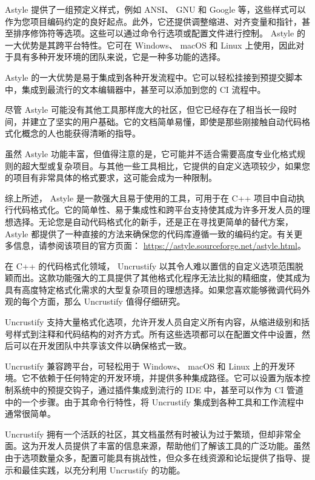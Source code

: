 Astyle 提供了一组预定义样式，例如 ANSI、 GNU 和 Google 等，这些样式可以作为您项目编码约定的良好起点。此外，它还提供调整缩进、对齐变量和指针，甚至排序修饰符等选项。这些可以通过命令行选项或配置文件进行控制。
Astyle 的一大优势是其跨平台特性。它可在 Windows、 macOS 和 Linux 上使用，因此对于具有多种开发环境的团队来说，它是一种多功能的选择。

Astyle 的一大优势是易于集成到各种开发流程中。它可以轻松挂接到预提交脚本中，集成到最流行的文本编辑器中，甚至可以添加到您的 CI 流程中。

尽管 Astyle 可能没有其他工具那样庞大的社区，但它已经存在了相当长一段时间，并建立了坚实的用户基础。它的文档简单易懂，即使是那些刚接触自动代码格式化概念的人也能获得清晰的指导。

虽然 Astyle 功能丰富，但值得注意的是，它可能并不适合需要高度专业化格式规则的超大型或复杂项目。与其他一些工具相比，它提供的自定义选项较少，如果您的项目有非常具体的格式要求，这可能会成为一种限制。

综上所述， Astyle 是一款强大且易于使用的工具，可用于在 C++ 项目中自动执行代码格式化。它的简单性、易于集成性和跨平台支持使其成为许多开发人员的理想选择。无论您是自动代码格式化的新手，还是正在寻找更简单的替代方案， Astyle 都提供了一种直接的方法来确保您的代码库遵循一致的编码约定。有关更多信息，请参阅该项目的官方页面： \url{https://astyle.sourceforge.net/astyle.html}。


在 C++ 的代码格式化领域， Uncrustify 以其令人难以置信的自定义选项范围脱颖而出。这款功能强大的工具提供了其他格式化程序无法比拟的精细度，使其成为具有高度特定格式化需求的大型复杂项目的理想选择。如果您喜欢能够微调代码外观的每个方面，那么 Uncrustify 值得仔细研究。

Uncrustify 支持大量格式化选项，允许开发人员自定义所有内容，从缩进级别和括号样式到注释和代码结构的对齐方式。所有这些选项都可以在配置文件中设置，然后可以在开发团队中共享该文件以确保格式一致。

Uncrustify 兼容跨平台，可轻松用于 Windows、 macOS 和 Linux 上的开发环境。它不依赖于任何特定的开发环境，并提供多种集成路径。它可以设置为版本控制系统中的预提交钩子，通过插件集成到流行的 IDE 中，甚至可以作为 CI 管道中的一个步骤。由于其命令行特性，将 Uncrustify 集成到各种工具和工作流程中通常很简单。

Uncrustify 拥有一个活跃的社区，其文档虽然有时被认为过于繁琐，但却非常全面。这为开发人员提供了丰富的信息来源，帮助他们了解该工具的广泛功能。虽然由于选项数量众多，配置可能具有挑战性，但众多在线资源和论坛提供了指导、提示和最佳实践，以充分利用 Uncrustify 的功能。

